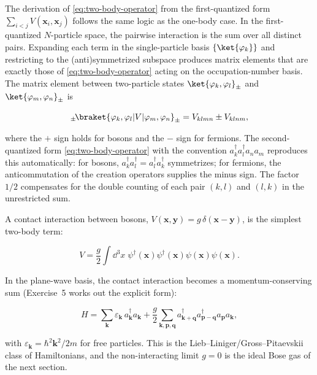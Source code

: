 \begin{note}
    The derivation of \eqref{eq:two-body-operator} from the first-quantized form $\sum_{i<j} V(\bm x_i, \bm x_j)$ follows the same logic as the one-body case. In the first-quantized $N$-particle space, the pairwise interaction is the sum over all distinct pairs. Expanding each term in the single-particle basis $\{\ket{\varphi_k}\}$ and restricting to the (anti)symmetrized subspace produces matrix elements that are exactly those of \eqref{eq:two-body-operator} acting on the occupation-number basis. The matrix element between two-particle states $\ket{\varphi_k, \varphi_l}_\pm$ and $\ket{\varphi_m, \varphi_n}_\pm$ is
    \begin{linenomath}
        \begin{equation*}
            {}_{\pm}\!\braket{\varphi_k, \varphi_l|V|\varphi_m, \varphi_n}_\pm
            = V_{klmn} \pm V_{klnm},
        \end{equation*}
    \end{linenomath}
    where the $+$ sign holds for bosons and the $-$ sign for fermions. The second-quantized form \eqref{eq:two-body-operator} with the convention $a_k^\dagger a_l^\dagger a_n a_m$ reproduces this automatically: for bosons, $a_k^\dagger a_l^\dagger = a_l^\dagger a_k^\dagger$ symmetrizes; for fermions, the anticommutation of the creation operators supplies the minus sign. The factor $1/2$ compensates for the double counting of each pair $(k,l)$ and $(l,k)$ in the unrestricted sum.
\end{note}

A contact interaction between bosons, $V(\bm x, \bm y) = g\,\delta(\bm x - \bm y)$, is the simplest two-body term:
\begin{linenomath}
    \begin{equation*}
        V = \frac{g}{2}\int\!\dd^3 x\;\psi^\dagger(\bm x)\psi^\dagger(\bm x)\psi(\bm x)\psi(\bm x).
    \end{equation*}
\end{linenomath}
In the plane-wave basis, the contact interaction becomes a momentum-conserving sum (Exercise~5 works out the explicit form):
\begin{linenomath}
    \begin{equation}
        H = \sum_{\bm k} \varepsilon_{\bm k}\,a_{\bm k}^\dagger a_{\bm k}
            + \frac{g}{2}\sum_{\bm k, \bm p, \bm q}
              a_{\bm k + \bm q}^\dagger a_{\bm p - \bm q}^\dagger a_{\bm p} a_{\bm k},
        \label{eq:contact-hamiltonian}
    \end{equation}
\end{linenomath}
with $\varepsilon_{\bm k} = \hbar^2 \bm k^2/2m$ for free particles. This is the Lieb--Liniger/Gross--Pitaevskii class of Hamiltonians, and the non-interacting limit $g = 0$ is the ideal Bose gas of the next section.

